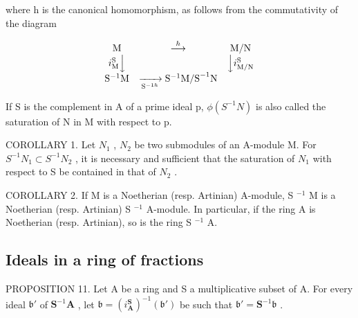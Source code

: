 where h is the canonical homomorphism, as follows from the commutativity of the diagram

\[
\begin{array}{c c c} \mathrm{M} & \stackrel {{h}} {{\longrightarrow}} & \mathrm{M/N} \\ i _ {\mathrm{M}} ^ {\mathrm{S}} \Big \downarrow & & \Big \downarrow i _ {\mathrm{M/N}} ^ {\mathrm{S}} \\ \mathrm{S} ^ {- 1} \mathrm{M} & \xrightarrow [ \mathrm{S} ^ {- 1 h} ]{} \mathrm{S} ^ {- 1} \mathrm{M/S} ^ {- 1} \mathrm{N} \end{array}
\]

If S is the complement in A of a prime ideal p, \(\phi(S^{-1}N)\) is also called the saturation of N in M with respect to p.

COROLLARY 1. Let \(N_{1}\) , \(N_{2}\) be two submodules of an A-module M. For \(S^{-1}N_{1} \subset S^{-1}N_{2}\) , it is necessary and sufficient that the saturation of \(N_{1}\) with respect to S be contained in that of \(N_{2}\) .

COROLLARY 2. If M is a Noetherian (resp. Artinian) A-module, S \(^{-1}\) M is a Noetherian (resp. Artinian) S \(^{-1}\) A-module. In particular, if the ring A is Noetherian (resp. Artinian), so is the ring S \(^{-1}\) A.

\subsection{Ideals in a ring of fractions}

PROPOSITION 11. Let A be a ring and S a multiplicative subset of A. For every ideal \(\mathfrak{b}'\) of \(\mathbf{S}^{-1}\mathbf{A}\) , let \(\mathfrak{b} = (i_{\mathbf{A}}^{\mathbf{S}})^{-1}(\mathfrak{b}')\) be such that \(\mathfrak{b}' = \mathbf{S}^{-1}\mathfrak{b}\) .


